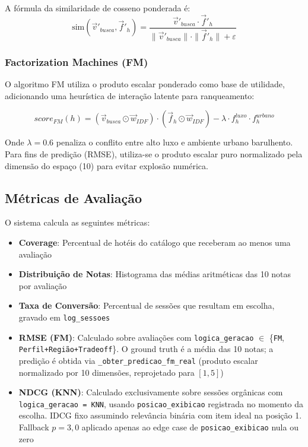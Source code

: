 \documentclass[10pt,twocolumn,letterpaper]{article}
\begin{document}
A fórmula da similaridade de cosseno ponderada é:
\begin{equation}
\text{sim}(\vec{v}'_{busca}, \vec{f}'_h) = \frac{\vec{v}'_{busca} \cdot \vec{f}'_h}{\|\vec{v}'_{busca}\| \cdot \|\vec{f}'_h\| + \varepsilon}
\end{equation}

\subsubsection{Factorization Machines (FM)}

O algoritmo FM utiliza o produto escalar ponderado como base de utilidade, adicionando uma heurística de interação latente para ranqueamento:

\begin{equation}
score_{FM}(h) = (\vec{v}_{busca} \odot \vec{w}_{IDF}) \cdot (\vec{f}_h \odot \vec{w}_{IDF}) - \lambda \cdot f_h^{luxo} \cdot f_h^{urbano}
\end{equation}

Onde $\lambda = 0.6$ penaliza o conflito entre alto luxo e ambiente urbano barulhento. Para fins de predição (RMSE), utiliza-se o produto escalar puro normalizado pela dimensão do espaço (10) para evitar explosão numérica.

\subsection{Métricas de Avaliação}

O sistema calcula as seguintes métricas:

\begin{itemize}
    \item \textbf{Coverage}: Percentual de hotéis do catálogo que receberam ao menos uma avaliação
    \item \textbf{Distribuição de Notas}: Histograma das médias aritméticas das 10 notas por avaliação
    \item \textbf{Taxa de Conversão}: Percentual de sessões que resultam em escolha, gravado em \texttt{log\_sessoes}
    \item \textbf{RMSE (FM)}: Calculado sobre avaliações com \texttt{logica\_geracao} $\in$ \{\texttt{FM}, \texttt{Perfil+Região+Tradeoff}\}. O ground truth é a média das 10 notas; a predição é obtida via \texttt{\_obter\_predicao\_fm\_real} (produto escalar normalizado por 10 dimensões, reprojetado para $[1,5]$)
    \item \textbf{NDCG (KNN)}: Calculado exclusivamente sobre sessões orgânicas com \texttt{logica\_geracao = KNN}, usando \texttt{posicao\_exibicao} registrada no momento da escolha. IDCG fixo assumindo relevância binária com item ideal na posição 1. Fallback $p=3{,}0$ aplicado apenas ao edge case de \texttt{posicao\_exibicao} nula ou zero
\end{itemize}
\end{document}
